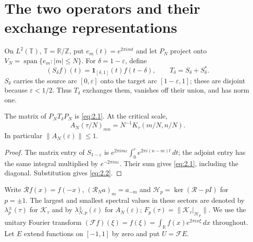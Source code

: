 \section{The two operators and their exchange representations}\label{sec:matrix}
On $L^2(\mathbb T)$, $\mathbb T=\mathbb R/\mathbb Z$, put
$e_m(t)=e^{2\pi imt}$ and let $P_N$ project onto
$V_N=\operatorname{span}\{e_m:|m|\le N\}$.  For $\delta=1-\varepsilon$,
define
\[
 (S_\delta f)(t)=\mathbf1_{[\delta,1]}(t)f(t-\delta),
 \qquad T_\delta=S_\delta+S_\delta^*.
\]
$S_\delta$ carries the source arc $[0,\varepsilon]$ onto the target arc
$[1-\varepsilon,1]$; these are disjoint because $\varepsilon<1/2$. Thus
$T_\delta$ exchanges them, vanishes off their union, and has norm one.

\begin{lemma}\label{lem:source-block}
The matrix of $P_NT_\delta P_N$ is \eqref{eq:2.1}.  At the critical scale,
\begin{equation}\label{eq:2.2}
 A_N(\tau/N)_{mn}=N^{-1}K_\tau(m/N,n/N).
\end{equation}
In particular $\|A_N(\varepsilon)\|\le1$.
\end{lemma}
\begin{proof}
The matrix entry of $S_{1-\varepsilon}$ is
$e^{2\pi im\varepsilon}\int_0^\varepsilon e^{2\pi i(n-m)t}\,dt$;
the adjoint entry has the same integral multiplied by
$e^{-2\pi in\varepsilon}$.  Their sum gives \eqref{eq:2.1}, including the
diagonal.  Substitution gives \eqref{eq:2.2}.
\end{proof}

Write $\mathcal Rf(x)=f(-x)$, $(\mathcal R_Na)_m=a_{-m}$ and
$\mathcal H_p=\ker(\mathcal R-pI)$ for $p=\pm1$.
The largest and smallest spectral values in these sectors are denoted by
$\lambda_p^\pm(\tau)$ for $\mathcal K_\tau$ and by $\lambda_{N,p}^\pm(\varepsilon)$
for $A_N(\varepsilon)$;
$F_p(\tau)=\|\mathcal K_\tau|_{\mathcal H_p}\|$.
We use the unitary Fourier transform
$(\mathcal Ff)(\xi)=\widehat f(\xi)=\int_{\mathbb R}f(x)e^{2\pi ix\xi}\,dx$
throughout.
Let $E$ extend functions on $[-1,1]$ by zero and put $U=\mathcal FE$.

